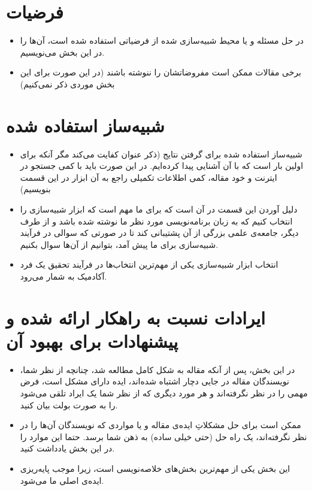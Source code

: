 \documentclass[a4paper,11pt]{article}
\newcommand*\tick{\item[\Checkmark]}
\begin{document}
    \section{فرضیات}\label{sec:evaluation}

      \begin{itemize}
        \tick { در حل مسئله و یا محیط شبیه‌سازی شده از فرضیاتی استفاده شده است، آن‌ها را در این بخش می‌نویسیم.}
        \tick {برخی مقالات ممکن است مفروضاتشان را ننوشته باشند (در این صورت برای این بخش موردی ذکر نمی‌کنیم)}
    \end{itemize}

    \section{شبیه‌ساز استفاده شده }\label{sec:limitations}

  \begin{itemize}
        \tick { شبیه‌ساز استفاده شده برای گرفتن نتایج (ذکر عنوان کفایت می‌کند مگر آنکه برای اولین بار است که با آن آشنایی پیدا کرده‌ایم. در این صورت باید با کمی جستجو در ایترنت و خود مقاله، کمی اطلاعات تکمیلی راجع به آن ابزار در این قسمت بنویسیم)}
      \tick {دلیل آوردن این قسمت در آن است که برای ما مهم است که ابزار شبیه‌سازی را انتخاب کنیم که به زبان برنامه‌نویسی مورد نظر ما نوشته شده باشد و از طرف دیگر، جامعه‌ی علمی بزرگی از آن پشتیبانی کند تا در صورتی که سوالی در فرآیند شبیه‌سازی برای ما پیش آمد، بتوانیم از آن‌ها سوال بکنیم. }
   \tick{انتخاب ابزار شبیه‌سازی یکی از مهم‌ترین انتخاب‌ها در فرآیند تحقیق یک فرد آکادمیک به شمار می‌رود.}
    \end{itemize}

    \section{ایرادات نسبت به راهکار ارائه شده و پیشنهادات برای بهبود آن}\label{sec:imporvments}

      \begin{itemize}
        \tick { در این بخش، پس از آنکه مقاله به شکل کامل مطالعه شد، چنانچه از نظر شما، نویسندگان مقاله در جایی دچار اشتباه شده‌اند، ایده دارای مشکل است، فرض مهمی را در نظر نگرفته‌اند و هر مورد دیگری که از نظر شما یک ایراد تلقی می‌شود را به صورت بولت بیان کنید.}
        \tick { ممکن است برای حل مشکلاتِ ایده‌ی مقاله و یا مواردی که نویسندگان آن‌ها را در نظر نگرفته‌اند، یک راه حل (حتی خیلی ساده) به ذهن شما برسد. حتما این موارد را در این بخش یادداشت کنید.}
        \tick { این بخش یکی از مهم‌ترین بخش‌های خلاصه‌نویسی است، زیرا موجب پایه‌ریزی ایده‌ی اصلی ما می‌شود.}
      \end{itemize}
\end{document}
